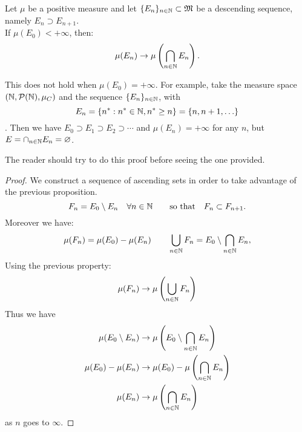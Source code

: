\begin{prop} \label{prop-mu-descending}
	Let $\mu$ be a positive measure and let $\{ E_n \}_{n \in \mathbb N} \subset \mathfrak M$ be a descending sequence, namely $E_n \supset E_{n+1}$.\\
	If $\mu(E_0) < +\infty$, then:
	$$
		\mu(E_n) \to \mu\left( \bigcap_{n \in \mathbb N} E_n \right).
	$$
\end{prop}
This does not hold when $\mu(E_0) = +\infty$. For example, take the measure space $(\mathbb N, \mathcal P(\mathbb N), \mu_C)$ and the sequence $\{E_n\}_{n \in \mathbb N}$, with $${E_n = \{ n^* : n^* \in \mathbb N, n^* \ge n \} = \{ n, n+1, \ldots \}}$$. Then we have $E_0 \supset E_1 \supset E_2 \supset \cdots$ and $\mu(E_n) = + \infty$ for any $n$, but $E = \cap_{n \in \mathbb N} E_n = \varnothing$.

The reader should try to do this proof before seeing the one provided.
\begin{proof}
	We construct a sequence of ascending sets in order to take advantage of the previous proposition.
	$$
		F_n = E_0 \setminus E_n \quad \forall n \in \mathbb N \qquad \text{so that} \quad F_n \subset F_{n+1}
	.
	$$
	Moreover we have:
	$$
		\mu(F_n) = \mu(E_0)-\mu(E_n)
		\qquad
		\bigcup_{n \in \mathbb N} F_n = E_0 \setminus \bigcap_{n \in \mathbb N} E_n
	,
	$$
	Using the previous property:
	$$
		\mu(F_n) \to \mu\left( \bigcup_{n \in \mathbb N} F_n \right)  
	$$
	Thus we have
	\begin{align*}
		\mu(E_0 \setminus E_n) & \to \mu\left( E_0 \setminus \bigcap_{n \in \mathbb N} E_n \right)\\
		\mu(E_0) - \mu(E_n) & \to \mu(E_0) - \mu\left(\bigcap_{n \in \mathbb N} E_n \right)\\
		\mu(E_n) & \to \mu\left(\bigcap_{n \in \mathbb N} E_n \right)\\
	\end{align*}
	as $n$ goes to $\infty$.
\end{proof}

